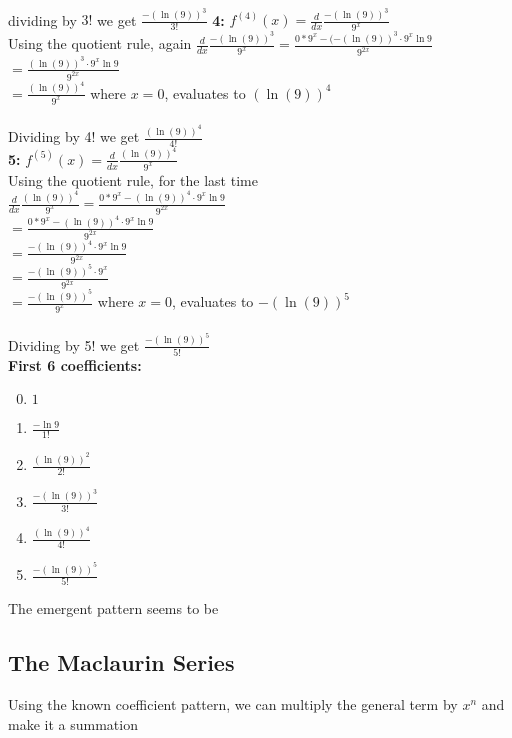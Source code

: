 \documentclass{article}
\begin{document}
\begin{multicols*}{2}
    \\[0in] dividing by $3!$ we get $\boxed{\frac{-(\ln(9))^3} {3!}}$
    \vfill\null
    \columnbreak
    \textbf{4: }$f^{(4)}(x)= \frac{d}{dx} \frac{-(\ln(9))^3}{9^{x}}$
    \\[0.1in]Using the quotient rule, again $\frac{d}{dx} \frac{-(\ln(9))^3}{9^{x}} = \frac{0*9^x-(-(\ln(9))^3\cdot9^x\ln9}{9^{2x}}$ 
    \\[0.1in]$= \frac{(\ln(9))^3\cdot9^x\ln9}{9^{2x}}$ 
    \\[0.1in]$= \frac{(\ln(9))^4}{9^{x}}$ where $x=0$, evaluates to ${(\ln(9))^4}$
    \\\\[0in]Dividing by 4! we get $\boxed{\frac{(\ln(9))^4}{4!}}$
    \\[0.1in]\textbf{5: }$f^{(5)}(x)= \frac{d}{dx} \frac{(\ln(9))^4}{9^{x}}$
    \\[0.1in]Using the quotient rule, for the last time \\[0.1in]$\frac{d}{dx}\frac{(\ln(9))^4}{9^{x}} = \frac{0*9^x-(\ln(9))^4\cdot9^x\ln9}{9^{2x}}$ 
    \\[0.1in]$ = \frac{0*9^x-(\ln(9))^4\cdot9^x\ln9}{9^{2x}}$ 
    \\[0.1in]$ = \frac{-(\ln(9))^4\cdot9^x\ln9}{9^{2x}}$ 
    \\[0.1in]$ = \frac{-(\ln(9))^5\cdot9^x}{9^{2x}}$ 
    \\[0.1in]$ = \frac{-(\ln(9))^5}{9^{x}}$ where $x=0$, evaluates to ${-(\ln(9))^5}$
    \\\\[0in]Dividing by 5! we get $\boxed{\frac{-(\ln(9))^5}{5!}}$
    \\[0.05in]
    \vfill\null
    \pagebreak
    \textbf{First 6 coefficients:}
    \begin{enumerate}
        \setcounter{enumi}{-1}
        \item $1$
        \item $\frac{-\ln9}{1!}$
        \item $\frac{(\ln(9))^2}{2!}$
        \item $\frac{-(\ln(9))^3}{3!}$
        \item $\frac{(\ln(9))^4}{4!}$
        \item $\frac{-(\ln(9))^5}{5!}$
    \end{enumerate}
    The emergent pattern seems to be 
    \subsection*{\textbf{The Maclaurin Series}}
    Using the known coefficient pattern, we can multiply the general term by $x^n$ and make it a summation 

\end{multicols*}
\end{document}
